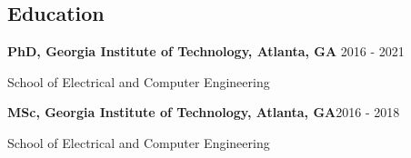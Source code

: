 \documentclass[margin, line]{res}
\newenvironment{list1}{
  \begin{list}{\ding{113}}{%
      \setlength{\itemsep}{0in}
      \setlength{\parsep}{0in} \setlength{\parskip}{0in}
      \setlength{\topsep}{0in} \setlength{\partopsep}{0in} 
      \setlength{\leftmargin}{0.17in}}}{\end{list}}
\newenvironment{list2}{
  \begin{list}{$\bullet$}{%
      \setlength{\itemsep}{0in}
      \setlength{\parsep}{0in} \setlength{\parskip}{0in}
      \setlength{\topsep}{0in} \setlength{\partopsep}{0in} 
      \setlength{\leftmargin}{0.2in}}}{\end{list}}
\begin{document}
\begin{resume}
\section{\sc \textbf{\large{Education}}}
\begin{list1}
	\item[] \textbf{PhD, Georgia Institute of Technology, Atlanta, GA} \hspace*{\fill}
	2016 - 2021
	\item[]School of Electrical and Computer Engineering
			\item[] \textbf{MSc, Georgia Institute of Technology, Atlanta, GA}\hspace*{\fill}2016 - 2018 \item[]School of Electrical and Computer Engineering


\end{list1}
\end{resume}
\end{document}

